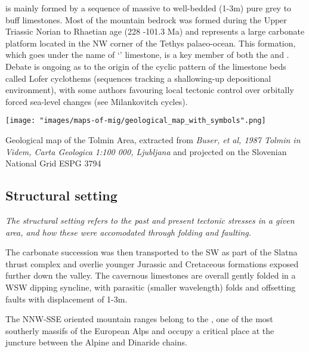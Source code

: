  is mainly formed by a sequence of massive to well-bedded (1-3m) pure grey to buff limestones. Most of the mountain bedrock was formed during the Upper Triassic Norian to Rhaetian age (228 -101.3 Ma) and represents a large carbonate platform located in the NW corner of the Tethys palaeo-ocean. This formation, which goes under the name of `' limestone, is a key member of both the  and . Debate is ongoing as to the origin of the cyclic pattern of the limestone beds called Lofer cyclothems (sequences tracking a shallowing-up depositional environment), with some authors favouring local tectonic control over orbitally forced sea-level changes (see Milankovitch cycles).


 \begin{pagemap}
 \checkoddpage \ifoddpage \forcerectofloat \else \forceversofloat \fi
\centering
  \texttt{[image: "images/maps-of-mig/geological\_map\_with\_symbols".png]}
  
  \caption{Geological map of the Tolmin Area, extracted from \textit{Buser, et al, 1987 Tolmin in Videm, Carta Geologica 1:100 000, Ljubljana} and projected on the Slovenian National Grid ESPG 3794}
  \label{map:mapofgeology}
 \end{pagemap}

\subsection{Structural setting}
\emph{The structural setting refers to the past and present tectonic stresses in a given area, and how these were accomodated through folding and faulting.}

The carbonate succession was then transported to the SW as part of the Slatna thrust complex and overlie younger Jurassic and Cretaceous formations exposed further down the valley. The  cavernous limestones are overall gently folded in a WSW dipping syncline, with parasitic (smaller wavelength) folds and offsetting faults with displacement of 1-3m.

 The NNW-SSE oriented mountain ranges belong to the , one of the most southerly massifs of the European Alps and occupy a critical place at the juncture between the Alpine and Dinaride chains. 
 
